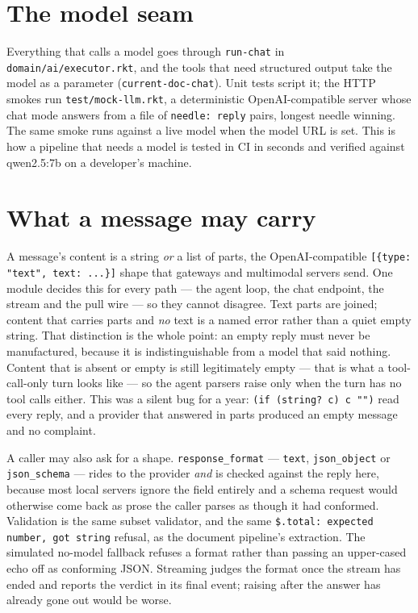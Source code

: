 \documentclass[11pt,a4paper]{report}
\begin{document}
\section{The model seam}

Everything that calls a model goes through \texttt{run-chat} in \texttt{domain/ai/executor.rkt}, and the tools that need structured output take the model as a parameter (\texttt{current-doc-chat}). Unit tests script it; the HTTP smokes run \texttt{test/mock-llm.rkt}, a deterministic OpenAI-compatible server whose chat mode answers from a file of \texttt{needle: reply} pairs, longest needle winning. The same smoke runs against a live model when the model URL is set. This is how a pipeline that needs a model is tested in CI in seconds and verified against qwen2.5:7b on a developer's machine.

\section{What a message may carry}

A message's content is a string \emph{or} a list of parts, the OpenAI-compatible \texttt{[\{type: "text", text: ...\}]} shape that gateways and multimodal servers send. One module decides this for every path --- the agent loop, the chat endpoint, the stream and the pull wire --- so they cannot disagree. Text parts are joined; content that carries parts and \emph{no} text is a named error rather than a quiet empty string. That distinction is the whole point: an empty reply must never be manufactured, because it is indistinguishable from a model that said nothing. Content that is absent or empty is still legitimately empty --- that is what a tool-call-only turn looks like --- so the agent parsers raise only when the turn has no tool calls either. This was a silent bug for a year: \texttt{(if (string? c) c "")} read every reply, and a provider that answered in parts produced an empty message and no complaint.

A caller may also ask for a shape. \texttt{response\_format} --- \texttt{text}, \texttt{json\_object} or \texttt{json\_schema} --- rides to the provider \emph{and} is checked against the reply here, because most local servers ignore the field entirely and a schema request would otherwise come back as prose the caller parses as though it had conformed. Validation is the same subset validator, and the same \texttt{\$.total: expected number, got string} refusal, as the document pipeline's extraction. The simulated no-model fallback refuses a format rather than passing an upper-cased echo off as conforming JSON. Streaming judges the format once the stream has ended and reports the verdict in its final event; raising after the answer has already gone out would be worse.
\end{document}
